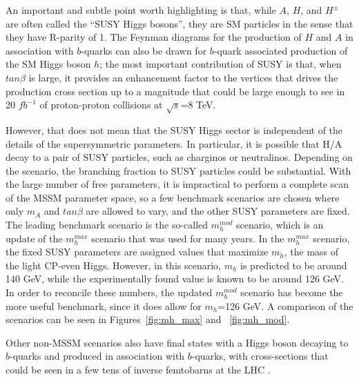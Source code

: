 An important and subtle point worth highlighting is that, while 
$A$, $H$, and $H^\pm$ are often called the ``SUSY Higgs bosons'', 
they are SM particles in the sense that they have R-parity of 1.  
The Feynman diagrams for the production of $H$ and $A$ 
in association with $b$-quarks can also be drawn for 
$b$-quark associated production of the SM Higgs boson $h$; 
the most important contribution of SUSY is that, when $tan\beta$ 
is large, it provides an enhancement factor to the vertices that 
drives the production cross section up to a magnitude that could be 
large enough to see in 20 $fb^{-1}$ of proton-proton collisions at $\sqrt{s}$=8 TeV.

However, that does not mean that the SUSY Higgs sector is 
independent of the details of the supersymmetric parameters.  In particular, 
it is possible that H/A decay to a pair of 
SUSY particles, such as charginos or neutralinos.  Depending on the 
scenario, the branching fraction to SUSY particles could be substantial.  
With the large number of free parameters, it is impractical to 
perform a complete scan of the MSSM parameter space, so a 
few benchmark scenarios are chosen where only $m_A$ 
and $tan\beta$ are allowed to vary, and 
the other SUSY parameters are fixed.  The leading benchmark scenario is 
the so-called $m_h^{mod}$ scenario, 
which is an update of the $m_h^{max}$ 
scenario that was used for many years.  In the $m_h^{max}$ 
scenario, the fixed SUSY parameters are assigned values that maximize $m_h$, 
the mass of the light CP-even Higgs.  However, 
in this scenario, $m_h$ is predicted to 
be around 140 GeV, while the experimentally found value is known 
to be around 126 GeV.  In order to reconcile these numbers, 
the updated $m_h^{mod}$ scenario has become 
the more useful benchmark, since it does allow for $m_h$=126 GeV.  
A comparison of the scenarios can be seen in Figures~\ref{fig:mh_max} and ~\ref{fig:mh_mod}.

Other non-MSSM scenarios also have final states with a Higgs boson
decaying to $b$-quarks and produced in association with $b$-quarks,
with cross-sections that could be seen in a few tens of inverse 
femtobarns at the LHC \cite{Gori}.   









